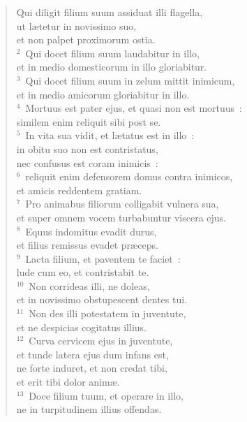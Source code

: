 \begin{flushleft}\begin{verse}\vspace{-19pt}\hspace{6pt}Qui diligit filium suum assiduat illi flagella,\\\hspace{6pt} ut l\ae tetur in novissimo suo,\\ et non palpet proximorum ostia.\\
${}^{2}$~Qui docet filium suum laudabitur in illo,\\ et in medio domesticorum in illo gloriabitur.\\
${}^{3}$~Qui docet filium suum in zelum mittit inimicum,\\ et in medio amicorum gloriabitur in illo.\\
${}^{4}$~Mortuus est pater ejus, et quasi non est mortuus~:\\ similem enim reliquit sibi post se.\\
${}^{5}$~In vita sua vidit, et l\ae tatus est in illo~:\\ in obitu suo non est contristatus,\\ nec confusus est coram inimicis~:\\
${}^{6}$~reliquit enim defensorem domus contra inimicos,\\ et amicis reddentem gratiam.\\
${}^{7}$~Pro animabus filiorum colligabit vulnera sua,\\ et super omnem vocem turbabuntur viscera ejus.\\
${}^{8}$~Equus indomitus evadit durus,\\ et filius remissus evadet pr\ae ceps.\\
${}^{9}$~Lacta filium, et paventem te faciet~:\\ lude cum eo, et contristabit te.\\
${}^{10}$~Non corrideas illi, ne doleas,\\ et in novissimo obstupescent dentes tui.\\
${}^{11}$~Non des illi potestatem in juventute,\\ et ne despicias cogitatus illius.\\
${}^{12}$~Curva cervicem ejus in juventute,\\ et tunde latera ejus dum infans est,\\ ne forte induret, et non credat tibi,\\ et erit tibi dolor anim\ae .\\
${}^{13}$~Doce filium tuum, et operare in illo,\\ ne in turpitudinem illius offendas.\end{verse}\end{flushleft}


